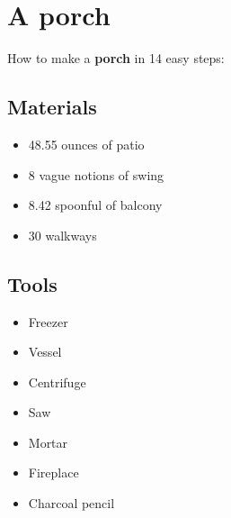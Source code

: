 \documentclass{article}
\begin{document}
\section{A porch}How to make a \textbf{porch} in 14 easy steps:

\subsection{Materials}\begin{itemize}
\item 
48.55 ounces of patio
\item 
8 vague notions of swing
\item 
8.42 spoonful of balcony
\item 
30 walkways
\end{itemize}
\subsection{Tools}\begin{itemize}
\item 
Freezer
\item 
Vessel
\item 
Centrifuge
\item 
Saw
\item 
Mortar
\item 
Fireplace
\item 
Charcoal pencil
\end{itemize}
\end{document}
